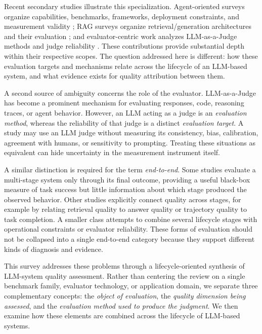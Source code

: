 Recent secondary studies illustrate this specialization. Agent-oriented surveys organize capabilities, benchmarks, frameworks, deployment constraints, and measurement validity \cite{yehudai2026surveyagents,kehkashan2026benchmarks,nageshwaran2026agent}; RAG surveys organize retrieval/generation architectures and their evaluation \cite{knollmeyer2026rag,wu2026ragsurvey}; and evaluator-centric work analyzes LLM-as-a-Judge methods and judge reliability \cite{nadas2026judges}. These contributions provide substantial depth within their respective scopes. The question addressed here is different: how these evaluation targets and mechanisms relate across the lifecycle of an LLM-based system, and what evidence exists for quality attribution between them.

A second source of ambiguity concerns the role of the evaluator. LLM-as-a-Judge has become a prominent mechanism for evaluating responses, code, reasoning traces, or agent behavior. However, an LLM acting as a judge is an \emph{evaluation method}, whereas the reliability of that judge is a distinct \emph{evaluation target}. A study may use an LLM judge without measuring its consistency, bias, calibration, agreement with humans, or sensitivity to prompting. Treating these situations as equivalent can hide uncertainty in the measurement instrument itself.

A similar distinction is required for the term \emph{end-to-end}. Some studies evaluate a multi-stage system only through its final outcome, providing a useful black-box measure of task success but little information about which stage produced the observed behavior. Other studies explicitly connect quality across stages, for example by relating retrieval quality to answer quality or trajectory quality to task completion. A smaller class attempts to combine several lifecycle stages with operational constraints or evaluator reliability. These forms of evaluation should not be collapsed into a single end-to-end category because they support different kinds of diagnosis and evidence.

This survey addresses these problems through a lifecycle-oriented synthesis of LLM-system quality assessment. Rather than centering the review on a single benchmark family, evaluator technology, or application domain, we separate three complementary concepts: the \emph{object of evaluation}, the \emph{quality dimension being assessed}, and the \emph{evaluation method used to produce the judgment}. We then examine how these elements are combined across the lifecycle of LLM-based systems.


